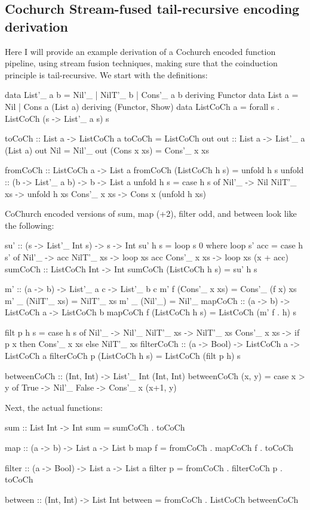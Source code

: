 
\subsection{Cochurch Stream-fused tail-recursive encoding derivation}\label{app:cochurch_tail}
Here I will provide an example derivation of a Cochurch encoded function pipeline, using stream fusion techniques, making sure that the coinduction principle is tail-recursive.
We start with the definitions:
\begin{spec}
data List'_ a b = Nil'_ | NilT'_ b | Cons'_ a b deriving Functor
data List a = Nil | Cons a (List a) deriving (Functor, Show)
data ListCoCh a = forall s . ListCoCh (s -> List'_ a s) s

toCoCh :: List a -> ListCoCh a
toCoCh = ListCoCh out
out :: List a -> List'_ a (List a)
out Nil = Nil'_
out (Cons x xs) = Cons'_ x xs

fromCoCh :: ListCoCh a -> List a
fromCoCh (ListCoCh h s) = unfold h s
unfold :: (b -> List'_ a b) -> b -> List a
unfold h s = case h s of
  Nil'_ -> Nil
  NilT'_ xs -> unfold h xs
  Cons'_ x xs -> Cons x (unfold h xs)
\end{spec}
CoChurch encoded versions of sum, map (+2), filter odd, and between look like the following:
\begin{spec}
su' :: (s -> List'_ Int s) -> s -> Int
su' h s = loop s 0
  where loop s' acc = case h s' of
    Nil'_ -> acc
    NilT'_ xs -> loop xs acc
    Cons'_ x xs -> loop xs (x + acc)
sumCoCh :: ListCoCh Int -> Int
sumCoCh (ListCoCh h s) = su' h s

m' :: (a -> b) -> List'_ a c -> List'_ b c
m' f (Cons'_ x xs) = Cons'_ (f x) xs
m' _ (NilT'_ xs) = NilT'_ xs
m' _ (Nil'_) = Nil'_
mapCoCh :: (a -> b) -> ListCoCh a -> ListCoCh b
mapCoCh f (ListCoCh h s) = ListCoCh (m' f . h) s

filt p h s = case h s of
               Nil'_ -> Nil'_
               NilT'_ xs -> NilT'_ xs
               Cons'_ x xs -> if p x then Cons'_ x xs else NilT'_ xs
filterCoCh :: (a -> Bool) -> ListCoCh a -> ListCoCh a
filterCoCh p (ListCoCh h s) = ListCoCh (filt p h) s

betweenCoCh :: (Int, Int) -> List'_ Int (Int, Int)
betweenCoCh (x, y) = case x > y of
  True -> Nil'_
  False -> Cons'_ x (x+1, y)
\end{spec}
Next, the actual functions:
\begin{spec}
sum :: List Int -> Int
sum = sumCoCh . toCoCh

map :: (a -> b) -> List a -> List b
map f = fromCoCh . mapCoCh f . toCoCh

filter :: (a -> Bool) -> List a -> List a
filter p = fromCoCh . filterCoCh p . toCoCh

between :: (Int, Int) -> List Int
between = fromCoCh . ListCoCh betweenCoCh
\end{spec}
